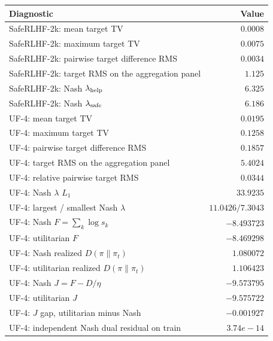 \begin{tabular}{lr}
\toprule
Diagnostic & Value\\
\midrule
SafeRLHF-2k: mean target TV & $0.0008$\\
SafeRLHF-2k: maximum target TV & $0.0075$\\
SafeRLHF-2k: pairwise target difference RMS & $0.0034$\\
SafeRLHF-2k: target RMS on the aggregation panel & $1.125$\\
SafeRLHF-2k: Nash $\lambda_{\rm help}$ & $6.325$\\
SafeRLHF-2k: Nash $\lambda_{\rm safe}$ & $6.186$\\
UF-4: mean target TV & $0.0195$\\
UF-4: maximum target TV & $0.1258$\\
UF-4: pairwise target difference RMS & $0.1857$\\
UF-4: target RMS on the aggregation panel & $5.4024$\\
UF-4: relative pairwise target RMS & $0.0344$\\
UF-4: Nash $\lambda$ $L_1$ & $33.9235$\\
UF-4: largest / smallest Nash $\lambda$ & $11.0426 / 7.3043$\\
UF-4: Nash $F=\sum_k\log s_k$ & $-8.493723$\\
UF-4: utilitarian $F$ & $-8.469298$\\
UF-4: Nash realized $D(\pi\|\pi_t)$ & $1.080072$\\
UF-4: utilitarian realized $D(\pi\|\pi_t)$ & $1.106423$\\
UF-4: Nash $J=F-D/\eta$ & $-9.573795$\\
UF-4: utilitarian $J$ & $-9.575722$\\
UF-4: $J$ gap, utilitarian minus Nash & $-0.001927$\\
UF-4: independent Nash dual residual on train & $3.74e-14$\\
\bottomrule
\end{tabular}
